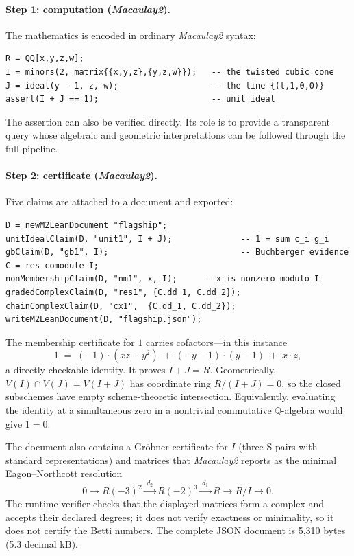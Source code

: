 \documentclass[11pt]{article}
\newcommand{\M}{\textit{Macaulay2}}
\newcommand{\QQ}{\mathbb{Q}}
\begin{document}
\paragraph{Step 1: computation (\M{}).}
The mathematics is encoded in ordinary \M{} syntax:

\begin{lstlisting}[style=m2style]
R = QQ[x,y,z,w];
I = minors(2, matrix{{x,y,z},{y,z,w}});   -- the twisted cubic cone
J = ideal(y - 1, z, w);                   -- the line {(t,1,0,0)}
assert(I + J == 1);                       -- unit ideal
\end{lstlisting}

\noindent
The assertion can also be verified directly.  Its role is to provide a
transparent query whose algebraic and
geometric interpretations can be followed through the full pipeline.

\paragraph{Step 2: certificate (\M{}).}
Five claims are attached to a document and exported:

\noindent\begin{minipage}{\linewidth}
\begin{lstlisting}[style=m2style]
D = newM2LeanDocument "flagship";
unitIdealClaim(D, "unit1", I + J);              -- 1 = sum c_i g_i
gbClaim(D, "gb1", I);                           -- Buchberger evidence
C = res comodule I;
nonMembershipClaim(D, "nm1", x, I);     -- x is nonzero modulo I
gradedComplexClaim(D, "res1", {C.dd_1, C.dd_2});
chainComplexClaim(D, "cx1",  {C.dd_1, C.dd_2});
writeM2LeanDocument(D, "flagship.json");
\end{lstlisting}
\end{minipage}

\noindent
The membership certificate for $1$ carries cofactors---in this
instance
\[
1 \;=\; (-1)\cdot(xz-y^2)\;+\;(-y-1)\cdot(y-1)\;+\;x\cdot z ,
\]
a directly checkable identity.  It proves $I+J=R$.  Geometrically,
$V(I)\cap V(J)=V(I+J)$ has coordinate ring $R/(I+J)=0$, so the closed
subschemes have empty scheme-theoretic intersection.  Equivalently,
evaluating the identity at a simultaneous zero in a nontrivial
commutative $\QQ$-algebra would give $1=0$.

The document also contains a Gr\"obner certificate for $I$ (three
S-pairs with standard representations) and matrices that \M{} reports
as the minimal Eagon--Northcott resolution~\cite{eagon-northcott}
\[
0 \to R(-3)^2 \xrightarrow{\;d_2\;} R(-2)^3 \xrightarrow{\;d_1\;} R
\to R/I \to 0.
\]
The runtime verifier checks that the displayed matrices form a complex
and accepts their declared degrees; it does not verify exactness or
minimality, so it does not certify the Betti numbers.  The complete JSON document is
5,310 bytes (5.3 decimal kB).
\end{document}
